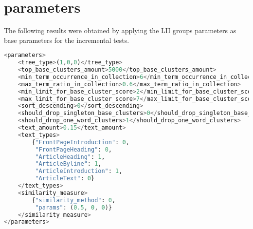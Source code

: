 

\section{\supervisor parameters}

The following results were obtained by applying the LII groups parameters as base parameters for the incremental tests.

\begin{lstlisting}[float=t, language=python, label=lst:richardparams, caption={Parameter set used by \protect\supervisor.}]
<parameters>
    <tree_type>(1,0,0)</tree_type>
    <top_base_clusters_amount>5000</top_base_clusters_amount>
    <min_term_occurrence_in_collection>6</min_term_occurrence_in_collection>
    <max_term_ratio_in_collection>0.6</max_term_ratio_in_collection>
    <min_limit_for_base_cluster_score>2</min_limit_for_base_cluster_score>
    <max_limit_for_base_cluster_score>7</max_limit_for_base_cluster_score>
    <sort_descending>0</sort_descending>
    <should_drop_singleton_base_clusters>0</should_drop_singleton_base_clusters>
    <should_drop_one_word_clusters>1</should_drop_one_word_clusters>
    <text_amount>0.15</text_amount>
    <text_types>
        {"FrontPageIntroduction": 0,
         "FrontPageHeading": 0,
         "ArticleHeading": 1,
         "ArticleByline": 1,
         "ArticleIntroduction": 1,
         "ArticleText": 0}
    </text_types>
    <similarity_measure>
        {"similarity_method": 0,
         "params": (0.5, 0, 0)}
    </similarity_measure>
</parameters>
\end{lstlisting}

